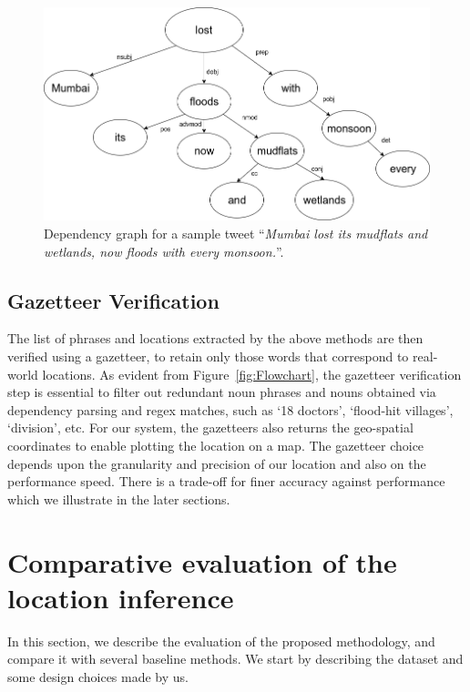 \begin{figure}[tb]
	\centering
		\includegraphics[scale=0.27]{dependency_graph}
		\caption{Dependency graph for a sample tweet ``{\it Mumbai lost its mudflats and wetlands, now floods with every monsoon.}''.}
		\label{fig:dependency_graph}
\vspace*{-5mm}
\end{figure}


\subsection{Gazetteer Verification}

The list of phrases and locations extracted by the above methods are then verified using a gazetteer, to retain only those words that correspond to real-world locations. As evident from Figure~\ref{fig:Flowchart}, the gazetteer verification step is essential to filter out redundant noun phrases and nouns obtained via dependency parsing and regex matches, such as `18 doctors', `flood-hit villages', `division', etc.
For our system, the gazetteers also returns the geo-spatial coordinates to enable plotting the location on a map. The gazetteer choice depends upon the granularity and precision of our location and also on the performance speed. There is a trade-off for finer accuracy against performance which we illustrate in the later sections.



%


\section{Comparative evaluation of the location inference}

In this section, we describe the evaluation of the proposed methodology,
and compare it with several baseline methods.
We start by describing the dataset and some design choices made by us.

